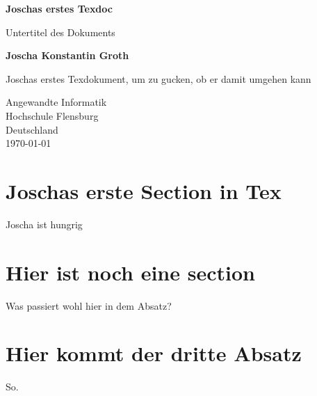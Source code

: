 \documentclass[a4paper, 12pt]{article}
\newcommand{\jokogr}{Joscha Konstantin Groth}
\begin{document}
\begin{titlepage}
    \begin{center}
        \vspace{1cm}

        \textbf{Joschas erstes Texdoc}

        \vspace{0.5cm}
        Untertitel des Dokuments

        \vspace{1.5cm}

        \textbf{\jokogr}

        \vfill

        Joschas erstes Texdokument, um zu gucken, ob er damit umgehen
        kann

        \vspace{0.8cm}

        Angewandte Informatik\\
        Hochschule Flensburg\\
        Deutschland\\
        \today

    \end{center}
\end{titlepage}
\pagebreak
\tableofcontents
\pagebreak
\section{Joschas erste Section in Tex}
Joscha ist hungrig

\section{Hier ist noch eine section}
Was passiert wohl hier in dem Absatz?

\section{Hier kommt der dritte Absatz}
So.
\end{document}

